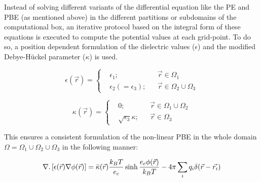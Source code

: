 \documentclass[9pt,tutorial]{livecoms}
\begin{document}
Instead of solving different variants of the differential equation like the PE and PBE (as mentioned above) in the different partitions or subdomains of the computational box, an iterative protocol based on the integral form of these equations is executed to compute the potential values at each grid-point. To do so, a position dependent formulation of the dielectric values ($ \epsilon $) and the modified Debye-Hückel parameter ($ \kappa $) is used. 

\begin{equation}
  \epsilon(\Vec{r}) = \left \{
  \begin{aligned}
    &\epsilon_1; && \Vec{r} \in \Omega_1 \\
    &\epsilon_2 (=\epsilon_3) ; && \Vec{r} \in \Omega_2 \cup \Omega_3
  \end{aligned} \right.
\end{equation}

\begin{equation}
  \kappa(\Vec{r}) = \left \{
  \begin{aligned}
    &0; && \Vec{r} \in \Omega_1 \cup \Omega_2 \\
    & \sqrt{\epsilon_3}\kappa ; && \Vec{r} \in \Omega_3
  \end{aligned} \right.
\end{equation}

This ensures a consistent formulation of the non-linear PBE in the whole domain $ \Omega = \Omega_1 \cup \Omega_2 \cup \Omega_3 $ in the following manner:

\begin{equation}
    \nabla.\left[\epsilon(\Vec{r})\nabla\phi(\Vec{r})\right] = \Bar{\kappa}(\Vec{r})\frac{k_BT}{e_c}\sinh{\frac{e_c\phi(\Vec{r})}{k_BT}} - 4\pi\sum_{i} {q_i \delta(\Vec{r} - \Vec{r_i})}
\end{equation}
\end{document}
